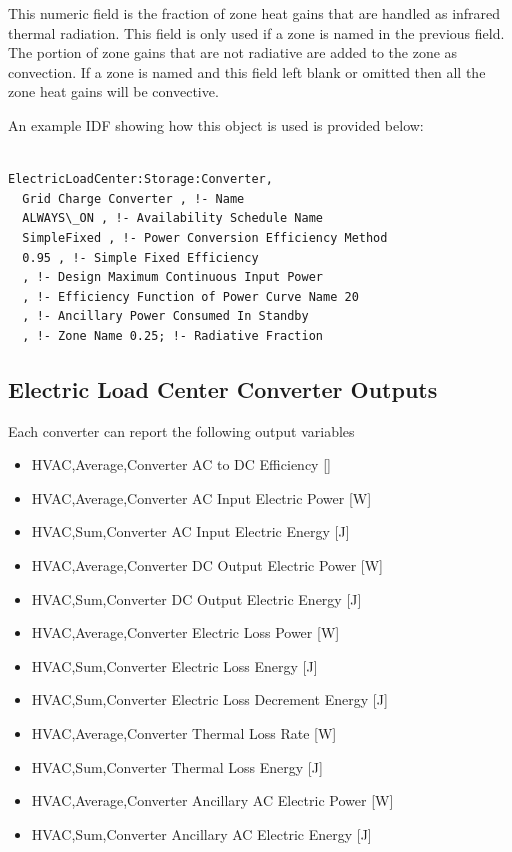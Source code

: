 This numeric field is the fraction of zone heat gains that are handled as infrared thermal radiation. This field is only used if a zone is named in the previous field. The portion of zone gains that are not radiative are added to the zone as convection. If a zone is named and this field left blank or omitted then all the zone heat gains will be convective.

An example IDF showing how this object is used is provided below:

\begin{lstlisting}

ElectricLoadCenter:Storage:Converter, 
  Grid Charge Converter , !- Name 
  ALWAYS\_ON , !- Availability Schedule Name
  SimpleFixed , !- Power Conversion Efficiency Method 
  0.95 , !- Simple Fixed Efficiency
  , !- Design Maximum Continuous Input Power 
  , !- Efficiency Function of Power Curve Name 20 
  , !- Ancillary Power Consumed In Standby 
  , !- Zone Name 0.25; !- Radiative Fraction
\end{lstlisting}

\subsection{Electric Load Center Converter Outputs}\label{electric-load-center-converter-outputs}

Each converter can report the following output variables

\begin{itemize}
\tightlist
\item
  HVAC,Average,Converter AC to DC Efficiency {[]}
\item
  HVAC,Average,Converter AC Input Electric Power {[}W{]}
\item
  HVAC,Sum,Converter AC Input Electric Energy {[}J{]}
\item
  HVAC,Average,Converter DC Output Electric Power {[}W{]}
\item
  HVAC,Sum,Converter DC Output Electric Energy {[}J{]}
\item
  HVAC,Average,Converter Electric Loss Power {[}W{]}
\item
  HVAC,Sum,Converter Electric Loss Energy {[}J{]}
\item
  HVAC,Sum,Converter Electric Loss Decrement Energy {[}J{]}
\item
  HVAC,Average,Converter Thermal Loss Rate {[}W{]}
\item
  HVAC,Sum,Converter Thermal Loss Energy {[}J{]}
\item
  HVAC,Average,Converter Ancillary AC Electric Power {[}W{]}
\item
  HVAC,Sum,Converter Ancillary AC Electric Energy {[}J{]}
\end{itemize}

